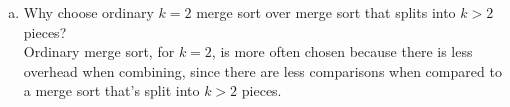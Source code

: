 \documentclass[11pt]{article}
\begin{document}
\begin{enumerate}
\begin{enumerate}[(a)]
			\item
				 Why choose ordinary $ k=2 $ merge sort over merge sort that splits into $ k>2 $ pieces? \\
					\hspace*{.4cm}
					Ordinary merge sort, for $ k=2 $, is more often chosen because there is less overhead when combining, since there are less comparisons when compared to a merge sort that's split into $ k>2 $ pieces.
			
		\end{enumerate}
	
	
\end{enumerate}
\end{document}
